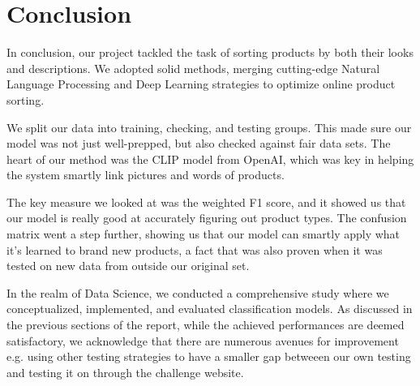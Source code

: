 \chapter{Conclusion}
\label{sec:conclusion}

In conclusion, our project tackled the task of sorting products by both their looks and descriptions. We adopted solid methods, merging cutting-edge Natural Language Processing and Deep Learning strategies to optimize online product sorting.

We split our data into training, checking, and testing groups. This made sure our model was not just well-prepped, but also checked against fair data sets. The heart of our method was the CLIP model from OpenAI, which was key in helping the system smartly link pictures and words of products.

The key measure we looked at was the weighted F1 score, and it showed us that our model is really good at accurately figuring out product types. The confusion matrix went a step further, showing us that our model can smartly apply what it's learned to brand new products, a fact that was also proven when it was tested on new data from outside our original set.

In the realm of Data Science, we conducted a comprehensive study where we conceptualized, implemented, and evaluated classification models. As discussed in the previous sections of the report, while the achieved performances are deemed satisfactory, we acknowledge that there are numerous avenues for improvement e.g. using other testing strategies to have a smaller gap betweeen our own testing and testing it on through the challenge website.







